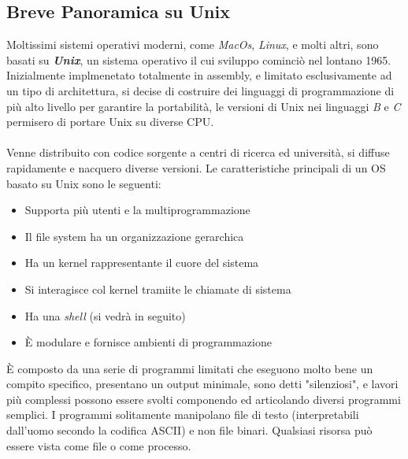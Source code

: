 \documentclass[12pt, letterpaper]{article}
\newcommand{\acc}{\\\hphantom{}\\}
\begin{document}
\subsection{Breve Panoramica su Unix}
Moltissimi sistemi operativi moderni, come \textit{MacOs}, \textit{Linux}, e molti altri, sono basati 
su \textbf{\textit{Unix}}, un sistema operativo il cui sviluppo cominciò nel lontano 1965. Inizialmente implmenetato 
totalmente in assembly, e limitato esclusivamente ad un tipo di architettura, si decise di costruire dei linguaggi 
di programmazione di più alto livello per garantire la portabilità, le versioni di Unix nei linguaggi \textit{B} e 
\textit{C} permisero di portare Unix su diverse CPU.\acc 
Venne distribuito con codice sorgente a centri di ricerca ed università, si diffuse rapidamente e nacquero diverse 
versioni. Le caratteristiche principali di un OS basato su Unix sono le seguenti: \begin{itemize}
    \item Supporta più utenti e la multiprogrammazione 
    \item Il file system ha un organizzazione gerarchica 
    \item Ha un kernel rappresentante il cuore del sistema 
    \item Si interagisce col kernel tramiite le chiamate di sistema
    \item Ha una \textit{shell} (si vedrà in seguito)
    \item È modulare e fornisce ambienti di programmazione
\end{itemize}
È composto da una serie di programmi limitati che eseguono molto bene un compito specifico, presentano un output 
minimale, sono detti "silenziosi", e lavori più complessi possono essere svolti componendo ed articolando diversi programmi 
semplici. I programmi solitamente manipolano file di testo (interpretabili dall'uomo secondo la codifica ASCII) e non file 
binari. Qualsiasi risorsa può essere vista come file o come processo.
\end{document}
